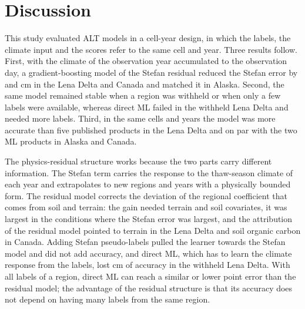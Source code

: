 \section{Discussion}\label{sec:discussion}
This study evaluated ALT models in a cell-year design, in which the labels, the climate input and the scores refer to the same cell and year. Three results follow. First, with the climate of the observation year accumulated to the observation day, a gradient-boosting model of the Stefan residual reduced the Stefan error by \ndrefLeblkRoabs{} and \ndrefCablkRoabs{} cm in the Lena Delta and Canada and matched it in Alaska. Second, the same model remained stable when a region was withheld or when only a few labels were available, whereas direct ML failed in the withheld Lena Delta and needed more labels. Third, in the same cells and years the model was more accurate than five published products in the Lena Delta and on par with the two ML products in Alaska and Canada.

The physics-residual structure works because the two parts carry different information. The Stefan term carries the response to the thaw-season climate of each year and extrapolates to new regions and years with a physically bounded form. The residual model corrects the deviation of the regional coefficient that comes from soil and terrain: the gain needed terrain and soil covariates, it was largest in the conditions where the Stefan error was largest, and the attribution of the residual model pointed to terrain in the Lena Delta and soil organic carbon in Canada. Adding Stefan pseudo-labels pulled the learner towards the Stefan model and did not add accuracy, and direct ML, which has to learn the climate response from the labels, lost \ndrefLeregDzabs{} cm of accuracy in the withheld Lena Delta. With all labels of a region, direct ML can reach a similar or lower point error than the residual model; the advantage of the residual structure is that its accuracy does not depend on having many labels from the same region.

